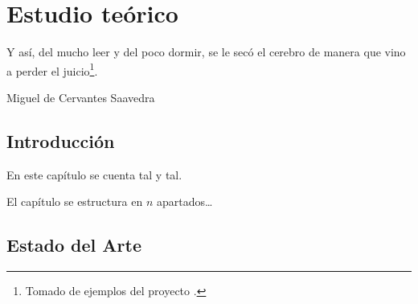 %
%
%
% 
%
%
%
%

\chapter{Estudio teórico}
\label{cha:estudio-teorico}

\begin{FraseCelebre}
  \begin{Frase}
    Y así, del mucho leer y del poco dormir, se le secó el cerebro de
    manera que vino a perder el juicio\footnote{Tomado de ejemplos del
      proyecto \texis{}.}.
  \end{Frase}
  \begin{Fuente}
    Miguel de Cervantes Saavedra
  \end{Fuente}
\end{FraseCelebre}


\section{Introducción}
\label{sec:introduccion-teoria}

En este capítulo se cuenta tal y tal.

El capítulo se estructura en $n$ apartados\ldots


\section{Estado del Arte}
\label{sec:estadoarte}

